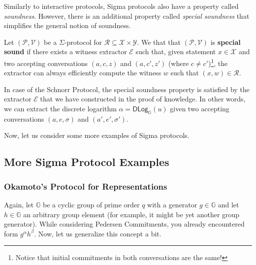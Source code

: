 \documentclass[../lecture-notes-148x210.tex]{subfiles}
\begin{document}
\vspace{-1mm}

Similarly to interactive protocols, Sigma protocols also have a property called \textit{soundness}. However, there is an additional property called \textit{special soundness} that simplifies the general notion of soundness.

\vspace{-1mm}

\begin{definition}
    Let $(\mathcal{P}, \mathcal{V})$ be a $\Sigma$-protocol for $\mathcal{R} \subseteq \mathcal{X} \times \mathcal{Y}$. We that that $(\mathcal{P},\mathcal{V})$ is \textbf{special sound} if there exists a witness extractor $\mathcal{E}$ such that, given statement $x \in \mathcal{X}$ and two accepting conversations $(a,c,z)$ and $(a,c',z')$ (where $c \neq c'$)\footnote{Notice that initial commitments in both conversations are the same!}, the extractor can always efficiently compute the witness $w$ such that $(x,w) \in \mathcal{R}$.
\end{definition}

\begin{example}
    In case of the Schnorr Protocol, the special soundness property is satisfied by the extractor $\mathcal{E}$ that we have constructed in the proof of knowledge. In other words, we can extract the discrete logarithm $\alpha = \mathsf{DLog}_{\mathbb{G}}(u)$ given two accepting conversations $(a,e,\sigma)$ and $(a',e',\sigma')$.
\end{example}

Now, let us consider some more examples of Sigma protocols.

\subsection{More Sigma Protocol Examples}

\subsubsection{Okamoto's Protocol for Representations}\label{section:okamoto_protocol}

Again, let $\mathbb{G}$ be a cyclic group of prime order $q$ with a generator $g \in \mathbb{G}$ and let $h \in \mathbb{G}$ an arbitrary group element (for example, it might be yet another group generator). While considering Pedersen Commitments, you already encountered form $g^{\alpha}h^{\beta}$. Now, let us generalize this concept a bit.
\end{document}
